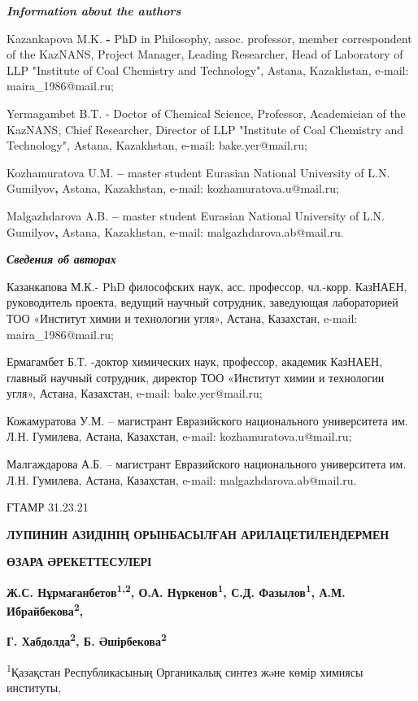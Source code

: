 \emph{\textbf{Information about the authors}}

Kazankapova M.K. \textbf{-} PhD in Philosophy, assoc. professor, member
correspondent of the KazNANS, Project Manager, Leading Researcher, Head
of Laboratory of LLP "Institute of Coal Chemistry and Technology",
Astana, Kazakhstan, e-mail: maira\_1986@mail.ru;

Yermagambet B.T. - Doctor of Chemical Science, Professor, Academician of
the KazNANS, Chief Researcher, Director of LLP "Institute of Coal
Chemistry and Technology", Astana, Kazakhstan, e-mail: bake.yer@mail.ru;

Kozhamuratova U.M. \textbf{--} master student Eurasian National
University of L.N. Gumilyov\textbf{,} Astana, Kazakhstan, e-mail:
kozhamuratova.u@mail.ru;

Malgazhdarova A.B. \textbf{--} master student Eurasian National
University of L.N. Gumilyov\textbf{,} Astana, Kazakhstan, e-mail:
malgazhdarova.ab@mail.ru.

\emph{\textbf{Сведения об авторах}}

Казанкапова М.К.- PhD философских наук, асс. профессор, чл.-корр.
КазНАЕН, руководитель проекта, ведущий научный сотрудник, заведующая
лабораторией ТОО «Институт химии и технологии угля», Астана, Казахстан,
e-mail: maira\_1986@mail.ru;

Ермагамбет Б.Т. -доктор химических наук, профессор, академик КазНАЕН,
главный научный сотрудник, директор ТОО «Институт химии и технологии
угля», Астана, Казахстан, e-mail: bake.yer@mail.ru;

Кожамуратова У.М. -- магистрант Евразийского национального университета
им. Л.Н. Гумилева, Астана, Казахстан, e-mail: kozhamuratova.u@mail.ru;

Малгаждарова А.Б. -- магистрант Евразийского национального университета
им. Л.Н. Гумилева, Астана, Казахстан, e-mail: malgazhdarova.ab@mail.ru.

ҒТАМР 31.23.21

\textbf{ЛУПИНИН АЗИДІНІҢ ОРЫНБАСЫЛҒАН АРИЛАЦЕТИЛЕНДЕРМЕН}

\textbf{ӨЗАРА ӘРЕКЕТТЕСУЛЕРІ}

\textbf{Ж.С. Нұрмағанбетов\textsuperscript{1,2}, О.А.
Нүркенов\textsuperscript{1}, С.Д. Фазылов\textsuperscript{1}, А.М.
Ибрайбекова\textsuperscript{2},}

\textbf{Г. Хабдолда\textsuperscript{2}, Б.
Әшірбекова\textsuperscript{2}}

\textsuperscript{1}Қазақстан Республикасының Органикалық синтез жəне
көмір химиясы институты,

